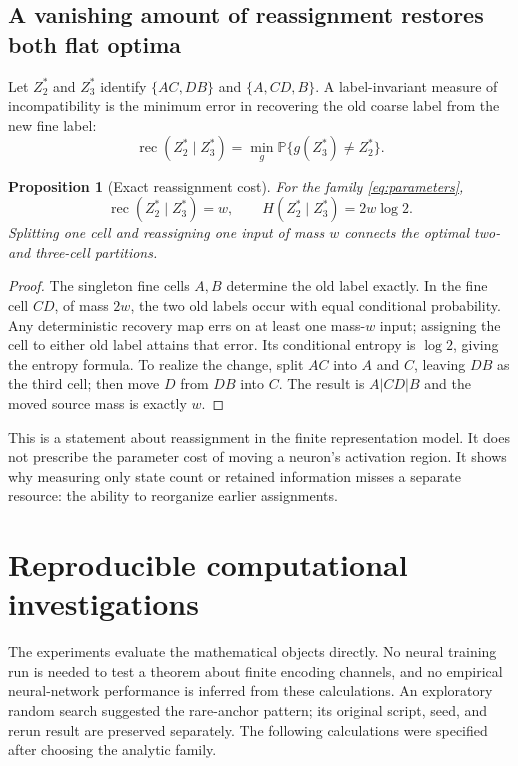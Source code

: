 \documentclass[11pt]{article}
\newtheorem{proposition}[theorem]{Proposition}
\theoremstyle{remark}\newtheorem{remark}[theorem]{Remark}
\newcommand{\Prob}{\mathbb P}
\begin{document}
\subsection{A vanishing amount of reassignment restores both flat optima}
Let $Z_2^*$ and $Z_3^*$ identify $\{AC,DB\}$ and $\{A,CD,B\}$.
A label-invariant measure of incompatibility is the minimum error in
recovering the old coarse label from the new fine label:
\begin{equation}
 \operatorname{rec}(Z_2^*\mid Z_3^*)
   =\min_g\Prob\{g(Z_3^*)\ne Z_2^*\}.
 \label{eq:recourse}
\end{equation}
\begin{proposition}[Exact reassignment cost]
\label{prop:recourse}
For the family \eqref{eq:parameters},
\[
 \operatorname{rec}(Z_2^*\mid Z_3^*)=w,
 \qquad H(Z_2^*\mid Z_3^*)=2w\log2.
\]
Splitting one cell and reassigning one input of mass $w$ connects the
optimal two- and three-cell partitions.
\end{proposition}
\begin{proof}
The singleton fine cells $A,B$ determine the old label exactly. In the fine
cell $CD$, of mass $2w$, the two old labels occur with equal conditional
probability. Any deterministic recovery map errs on at least one mass-$w$
input; assigning the cell to either old label attains that error. Its
conditional entropy is $\log2$, giving the entropy formula. To realize
the change, split $AC$ into $A$ and $C$, leaving $DB$ as the third cell;
then move $D$ from $DB$ into $C$. The result is $A|CD|B$ and the moved
source mass is exactly $w$.
\end{proof}

This is a statement about reassignment in the finite representation model.
It does not prescribe the parameter cost of moving a neuron's activation
region. It shows why measuring only state count or retained information
misses a separate resource: the ability to reorganize earlier assignments.



\section{Reproducible computational investigations}
\label{sec:computations}
The experiments evaluate the mathematical objects directly. No neural
training run is needed to test a theorem about finite encoding channels,
and no empirical neural-network performance is inferred from these
calculations. An exploratory random search suggested the rare-anchor
pattern; its original script, seed, and rerun result are preserved separately.
The following calculations were specified after choosing the analytic family.
\end{document}
